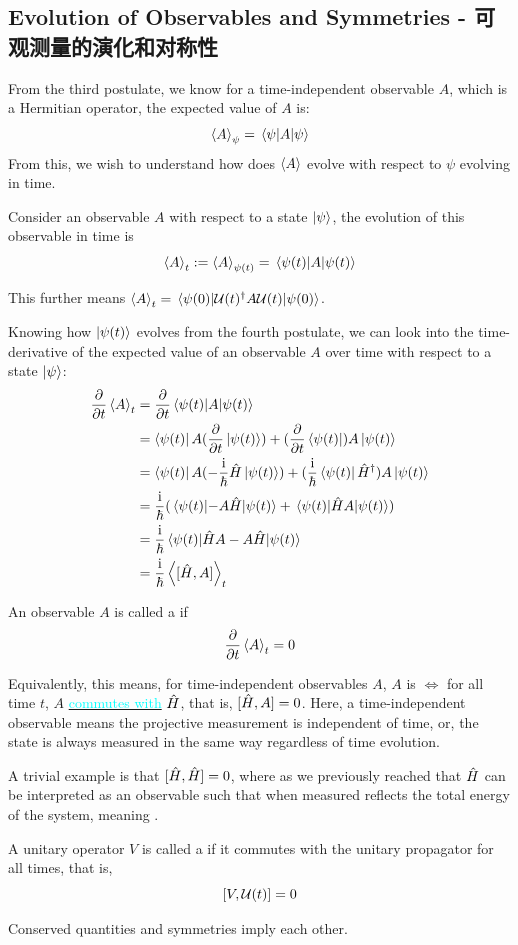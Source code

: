 \subsection{Evolution of Observables and Symmetries - 可观测量的演化和对称性}
From the third postulate, we know for a time-independent observable $A$, which is a Hermitian operator, the expected value of $A$ is:
$$\expval{A}_\psi = \expval{A}{\psi}$$
From this, we wish to understand how does $\expval{A}$ evolve with respect to $\psi$ evolving in time.
\begin{definition}
    Consider an observable $A$ with respect to a state $\ket{\psi}$, the evolution of this observable in time is
    $$\expval{A}_t := \expval{A}_{\psi(t)} = \expval{A}{\psi(t)}$$
\end{definition}
This further means $\expval{A}_t = \expval{\mathcal{U}(t)^{\dagger}A\mathcal{U}(t)}{\psi(0)}$. \par
Knowing how $\ket{\psi(t)}$ evolves from the fourth postulate, we can look into the time-derivative of the expected value of an observable $A$ over time with respect to a state $\ket{\psi}$:
\begin{align*}
    \pdv{t} \expval{A}_t &= \pdv{t} \expval{A}{\psi(t)} \\
    &= \bra{\psi(t)}A(\pdv{t}\ket{\psi(t)}) + (\pdv{t}\bra{\psi(t)})A\ket{\psi(t)} \\
    &= \bra{\psi(t)}A(-\frac{\mathrm{i}}{\hbar} \hat{H} \ket{\psi(t)}) + (\frac{\mathrm{i}}{\hbar} \bra{\psi(t)} \hat{H}^{\dagger})A\ket{\psi(t)} \\
    &= \frac{\mathrm{i}}{\hbar}(\expval{-A\hat{H}}{\psi(t)} + \expval{\hat{H}A}{\psi(t)}) \\
    &= \frac{\mathrm{i}}{\hbar} \expval{\hat{H}A-A\hat{H}}{\psi(t)} \\
    &= \frac{\mathrm{i}}{\hbar} \expval{[\hat{H}, A]}_t
\end{align*}
\begin{definition}
    An observable $A$ is called a  if
    $$\pdv{t} \expval{A}_t = 0$$
\end{definition}
Equivalently, this means, for time-independent observables $A$, $A$ is  $\iff$ for all time $t$, $A$ \hyperref[subsec:commutator]{\textcolor{cyan}{commutes with}} $\hat{H}$, that is, $[\hat{H}, A] = 0$. Here, a time-independent observable means the projective measurement is independent of time, or, the state is always measured in the same way regardless of time evolution. \par
A trivial example is that $[\hat{H}, \hat{H}] = 0$, where as we previously reached that $\hat{H}$ can be interpreted as an observable such that when measured reflects the total energy of the system, meaning .
\begin{definition}
    A unitary operator $V$ is called a  if it commutes with the unitary propagator for all times, that is,
    $$[V, \mathcal{U}(t)] = 0$$
\end{definition}
Conserved quantities and symmetries imply each other.

\newpage